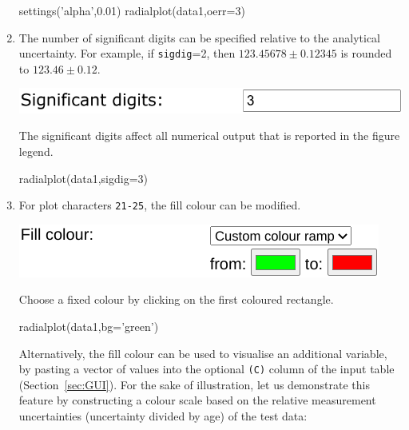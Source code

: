 \begin{refsection}
\begin{enumerate}
\begin{console}
settings('alpha',0.01)
radialplot(data1,oerr=3)
\end{console}

\item The number of significant digits can be specified relative to
  the analytical uncertainty. For example, if \texttt{sigdig}=2, then
  $123.45678 \pm 0.12345$ is rounded to $123.46 \pm 0.12$.

\noindent\begin{minipage}[t]{.45\linewidth}
\strut\vspace*{-\baselineskip}\newline
\includegraphics[width=\linewidth]{../figures/OtherRadialSigdig.png}
\end{minipage}
\begin{minipage}[t]{.55\linewidth}
  The significant digits affect all numerical output that is reported
  in the figure legend.
\end{minipage}

\begin{console}
radialplot(data1,sigdig=3)
\end{console}

\item For plot characters \texttt{21-25}, the fill colour can be
  modified.

\noindent\begin{minipage}[t]{.5\linewidth}
\strut\vspace*{-\baselineskip}\newline
\includegraphics[width=\linewidth]{../figures/OtherRadialBG.png}
\end{minipage}
\begin{minipage}[t]{.5\linewidth}
Choose a fixed colour by clicking on the first coloured rectangle.
\end{minipage}

\begin{console}
radialplot(data1,bg='green')
\end{console}

Alternatively, the fill colour can be used to visualise an additional
variable, by pasting a vector of values into the optional \texttt{(C)}
column of the input table (Section~\ref{sec:GUI}). For the sake of
illustration, let us demonstrate this feature by constructing a colour
scale based on the relative measurement uncertainties (uncertainty
divided by age) of the test data:


\end{enumerate}
\end{refsection}
